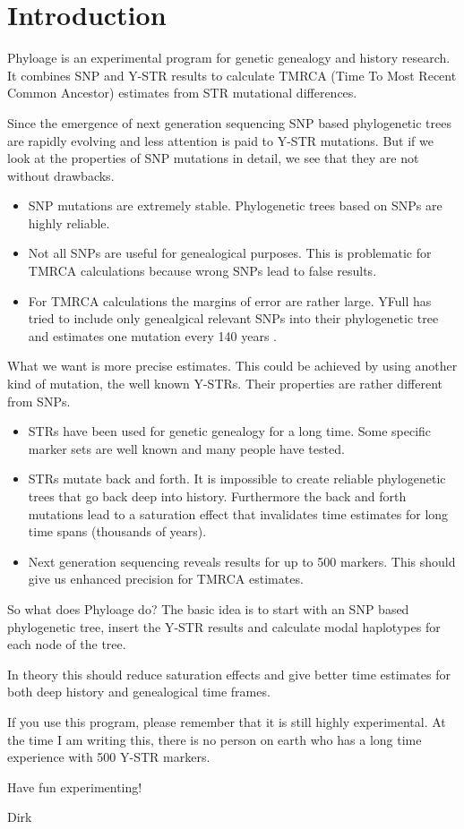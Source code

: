 \section{Introduction}

Phyloage is an experimental program for genetic genealogy
and history research. It combines SNP and Y-STR results to
calculate TMRCA (Time To Most Recent Common Ancestor)
estimates from STR mutational differences.

Since the emergence of next generation sequencing SNP based
phylogenetic trees are rapidly evolving and less attention
is paid to Y-STR mutations. But if we look at the properties
of SNP mutations in detail, we see that they are not without
drawbacks.

\begin{itemize}
\item SNP mutations are extremely stable. Phylogenetic trees
	based on SNPs are highly reliable.
\item Not all SNPs are useful for genealogical purposes. This
	is problematic for TMRCA calculations because wrong SNPs
	lead to false results.
\item For TMRCA calculations the margins of error are rather large.
	YFull has tried to include only genealgical relevant SNPs
	into their phylogenetic tree \cite{YFullTree} and estimates
	one mutation every 140 years \cite{YFullMutationRate}.
\end{itemize}

What we want is more precise estimates. This could be achieved
by using another kind of mutation, the well known Y-STRs. Their
properties are rather different from SNPs.

\begin{itemize}
\item STRs have been used for genetic genealogy for a long
	time. Some specific marker sets are well known and many
	people have tested.
\item STRs mutate back and forth. It is impossible to create
	reliable phylogenetic trees that go back deep into
	history. Furthermore the back and forth mutations lead
	to a saturation effect that invalidates time estimates
	for long time spans (thousands of years).
\item Next generation sequencing reveals results for up to
	500 markers. This should give us enhanced precision for
	TMRCA estimates.
\end{itemize}

So what does Phyloage do? The basic idea is to start with an
SNP based phylogenetic tree, insert the Y-STR results and
calculate modal haplotypes for each node of the tree. 

In theory this should reduce saturation effects and give
better time estimates for both deep history and genealogical
time frames.

If you use this program, please remember that it is still
highly experimental. At the time I am writing this, there
is no person on earth who has a long time experience with
500 Y-STR markers.

Have fun experimenting!

\vspace{1em} Dirk



